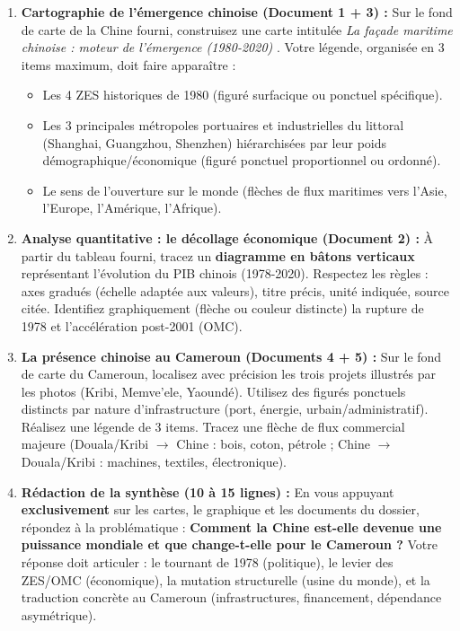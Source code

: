 \documentclass[11pt]{article}
\begin{document}
\begin{enumerate}
    \item \textbf{Cartographie de l'émergence chinoise (Document 1 + 3) :} Sur le fond de carte de la Chine fourni, construisez une carte intitulée \og \emph{La façade maritime chinoise : moteur de l'émergence (1980-2020)} \fg{}. Votre légende, organisée en 3 items maximum, doit faire apparaître :
    \begin{itemize}
        \item Les 4 ZES historiques de 1980 (figuré surfacique ou ponctuel spécifique).
        \item Les 3 principales métropoles portuaires et industrielles du littoral (Shanghai, Guangzhou, Shenzhen) hiérarchisées par leur poids démographique/économique (figuré ponctuel proportionnel ou ordonné).
        \item Le sens de l'ouverture sur le monde (flèches de flux maritimes vers l'Asie, l'Europe, l'Amérique, l'Afrique).
    \end{itemize}
    \item \textbf{Analyse quantitative : le décollage économique (Document 2) :} À partir du tableau fourni, tracez un \textbf{diagramme en bâtons verticaux} représentant l'évolution du PIB chinois (1978-2020). Respectez les règles : axes gradués (échelle adaptée aux valeurs), titre précis, unité indiquée, source citée. Identifiez graphiquement (flèche ou couleur distincte) la rupture de 1978 et l'accélération post-2001 (OMC).
    \item \textbf{La présence chinoise au Cameroun (Documents 4 + 5) :} Sur le fond de carte du Cameroun, localisez avec précision les trois projets illustrés par les photos (Kribi, Memve'ele, Yaoundé). Utilisez des figurés ponctuels distincts par nature d'infrastructure (port, énergie, urbain/administratif). Réalisez une légende de 3 items. Tracez une flèche de flux commercial majeure (Douala/Kribi $\rightarrow$ Chine : bois, coton, pétrole ; Chine $\rightarrow$ Douala/Kribi : machines, textiles, électronique).
    \item \textbf{Rédaction de la synthèse (10 à 15 lignes) :} En vous appuyant \textbf{exclusivement} sur les cartes, le graphique et les documents du dossier, répondez à la problématique : \og \textbf{Comment la Chine est-elle devenue une puissance mondiale et que change-t-elle pour le Cameroun ?} \fg{} Votre réponse doit articuler : le tournant de 1978 (politique), le levier des ZES/OMC (économique), la mutation structurelle (usine du monde), et la traduction concrète au Cameroun (infrastructures, financement, dépendance asymétrique).
\end{enumerate}
\end{document}
